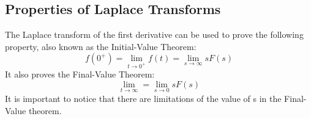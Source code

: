 \documentclass[nobib]{tufte-handout}
\begin{document}
\subsection{Properties of Laplace Transforms}
The Laplace transform of the first derivative can be used to prove the
following property, also known as the Initial-Value Theorem:\\
\begin{equation*}
    f(0^+) = \lim_{t\rightarrow 0^+}f(t) = \lim_{s\rightarrow\infty}sF(s)
\end{equation*}
It also proves the Final-Value Theorem:
\begin{equation*}
    \lim_{t\rightarrow\infty} = \lim_{s\rightarrow 0}sF(s)
\end{equation*}
It is important to notice that there are limitations of the value of s in the Final-Value theorem.\\
\end{document}
